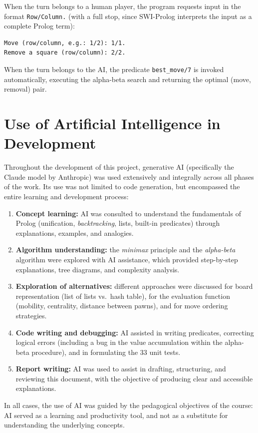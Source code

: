 When the turn belongs to a human player, the program requests
input in the format \texttt{Row/Column.} (with a full stop, since
SWI-Prolog interprets the input as a complete Prolog term):

\begin{verbatim}
Move (row/column, e.g.: 1/2): 1/1.
Remove a square (row/column): 2/2.
\end{verbatim}

When the turn belongs to the AI, the predicate \texttt{best\_move/7}
is invoked automatically, executing the alpha-beta search and returning
the optimal (move, removal) pair.

\section{Use of Artificial Intelligence in Development}
\label{sec:ai_usage}

Throughout the development of this project, generative AI
(specifically the Claude model by Anthropic) was used extensively and
integrally across all phases of the work. Its use was not limited to
code generation, but encompassed the entire learning and development process:

\begin{enumerate}
  \item \textbf{Concept learning:} AI was consulted to understand
        the fundamentals of Prolog (unification,
        \textit{backtracking}, lists, built-in predicates) through
        explanations, examples, and analogies.

  \item \textbf{Algorithm understanding:} the \textit{minimax}
        principle and the \textit{alpha-beta} algorithm were
        explored with AI assistance, which provided step-by-step
        explanations, tree diagrams, and complexity analysis.

  \item \textbf{Exploration of alternatives:} different approaches
        were discussed for board representation
        (list of lists vs.\ hash table), for the evaluation function
        (mobility, centrality, distance between pawns), and for
        move ordering strategies.

  \item \textbf{Code writing and debugging:} AI assisted in
        writing predicates, correcting logical errors
        (including a bug in the value accumulation within the
        alpha-beta procedure), and in formulating the 33 unit tests.

  \item \textbf{Report writing:} AI was used to assist in
        drafting, structuring, and reviewing this document,
        with the objective of producing clear and accessible
        explanations.
\end{enumerate}

In all cases, the use of AI was guided by the pedagogical objectives
of the course: AI served as a learning and productivity tool,
and not as a substitute for understanding the underlying concepts.
